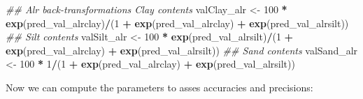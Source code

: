 \documentclass[]{book}
\newenvironment{Shaded}{\begin{snugshade}}{\end{snugshade}}
\newcommand{\CommentTok}[1]{\textcolor[rgb]{0.56,0.35,0.01}{\textit{#1}}}
\newcommand{\DecValTok}[1]{\textcolor[rgb]{0.00,0.00,0.81}{#1}}
\newcommand{\KeywordTok}[1]{\textcolor[rgb]{0.13,0.29,0.53}{\textbf{#1}}}
\newcommand{\NormalTok}[1]{#1}
\newcommand{\OperatorTok}[1]{\textcolor[rgb]{0.81,0.36,0.00}{\textbf{#1}}}
\newcommand{\StringTok}[1]{\textcolor[rgb]{0.31,0.60,0.02}{#1}}
\begin{document}
\begin{Shaded}
\begin{Highlighting}[]
\CommentTok{## Alr back-transformations Clay contents}
\NormalTok{valClay_alr <-}\StringTok{ }\DecValTok{100} \OperatorTok{*}\StringTok{ }\KeywordTok{exp}\NormalTok{(pred_val_alrclay)}\OperatorTok{/}\NormalTok{(}\DecValTok{1} \OperatorTok{+}\StringTok{ }\KeywordTok{exp}\NormalTok{(pred_val_alrclay) }\OperatorTok{+}\StringTok{ }\KeywordTok{exp}\NormalTok{(pred_val_alrsilt))}
\CommentTok{## Silt contents}
\NormalTok{valSilt_alr <-}\StringTok{ }\DecValTok{100} \OperatorTok{*}\StringTok{ }\KeywordTok{exp}\NormalTok{(pred_val_alrsilt)}\OperatorTok{/}\NormalTok{(}\DecValTok{1} \OperatorTok{+}\StringTok{ }\KeywordTok{exp}\NormalTok{(pred_val_alrclay) }\OperatorTok{+}\StringTok{ }\KeywordTok{exp}\NormalTok{(pred_val_alrsilt))}
\CommentTok{## Sand contents}
\NormalTok{valSand_alr <-}\StringTok{ }\DecValTok{100} \OperatorTok{*}\StringTok{ }\DecValTok{1}\OperatorTok{/}\NormalTok{(}\DecValTok{1} \OperatorTok{+}\StringTok{ }\KeywordTok{exp}\NormalTok{(pred_val_alrclay) }\OperatorTok{+}\StringTok{ }\KeywordTok{exp}\NormalTok{(pred_val_alrsilt))}
\end{Highlighting}
\end{Shaded}

Now we can compute the parameters to asses accuracies and precisions:
\end{document}

